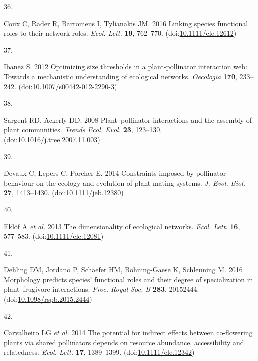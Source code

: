 \documentclass[
  12pt,
  a4paper,
]{article}
\newlength{\cslhangindent}
\newlength{\csllabelwidth}
\newlength{\cslentryspacingunit} %
\newenvironment{CSLReferences}[2] %
 {%
  \setlength{\parindent}{0pt}
  \ifodd #1
  \let\oldpar\par
  \def\par{\hangindent=\cslhangindent\oldpar}
  \fi
  \setlength{\parskip}{#2\cslentryspacingunit}
 }%
 {}
\newcommand{\CSLLeftMargin}[1]{\parbox[t]{\csllabelwidth}{#1}}
\newcommand{\CSLRightInline}[1]{\parbox[t]{\linewidth - \csllabelwidth}{#1}\break}
\begin{document}
\begin{CSLReferences}{0}{0}
\leavevmode{}%
\CSLLeftMargin{36. }
\CSLRightInline{Coux C, Rader R, Bartomeus I, Tylianakis JM. 2016 Linking species functional roles to their network roles. \emph{Ecol. Lett.} \textbf{19}, 762--770. (doi:\href{https://doi.org/10.1111/ele.12612}{10.1111/ele.12612})}

\leavevmode{}%
\CSLLeftMargin{37. }
\CSLRightInline{Ibanez S. 2012 Optimizing size thresholds in a plant-pollinator interaction web: Towards a mechanistic understanding of ecological networks. \emph{Oecologia} \textbf{170}, 233--242. (doi:\href{https://doi.org/10.1007/s00442-012-2290-3}{10.1007/s00442-012-2290-3})}

\leavevmode{}%
\CSLLeftMargin{38. }
\CSLRightInline{Sargent RD, Ackerly DD. 2008 Plant--pollinator interactions and the assembly of plant communities. \emph{Trends Ecol. Evol.} \textbf{23}, 123--130. (doi:\href{https://doi.org/10.1016/j.tree.2007.11.003}{10.1016/j.tree.2007.11.003})}

\leavevmode{}%
\CSLLeftMargin{39. }
\CSLRightInline{Devaux C, Lepers C, Porcher E. 2014 Constraints imposed by pollinator behaviour on the ecology and evolution of plant mating systems. \emph{J. Evol. Biol.} \textbf{27}, 1413--1430. (doi:\href{https://doi.org/10.1111/jeb.12380}{10.1111/jeb.12380})}

\leavevmode{}%
\CSLLeftMargin{40. }
\CSLRightInline{Eklöf A \emph{et al.} 2013 The dimensionality of ecological networks. \emph{Ecol. Lett.} \textbf{16}, 577--583. (doi:\href{https://doi.org/10.1111/ele.12081}{10.1111/ele.12081})}

\leavevmode{}%
\CSLLeftMargin{41. }
\CSLRightInline{Dehling DM, Jordano P, Schaefer HM, Böhning-Gaese K, Schleuning M. 2016 Morphology predicts species' functional roles and their degree of specialization in plant--frugivore interactions. \emph{Proc. Royal Soc. B} \textbf{283}, 20152444. (doi:\href{https://doi.org/10.1098/rspb.2015.2444}{10.1098/rspb.2015.2444})}

\leavevmode{}%
\CSLLeftMargin{42. }
\CSLRightInline{Carvalheiro LG \emph{et al.} 2014 The potential for indirect effects between co-flowering plants via shared pollinators depends on resource abundance, accessibility and relatedness. \emph{Ecol. Lett.} \textbf{17}, 1389--1399. (doi:\href{https://doi.org/10.1111/ele.12342}{10.1111/ele.12342})}


\end{CSLReferences}
\end{document}
